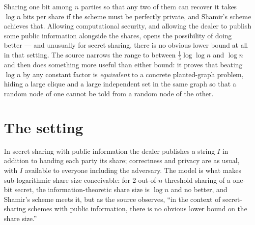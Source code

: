 \documentclass{aicr-conjecture}
\begin{document}

\vspace{0.4em}

\begin{informalconjecture}
Sharing one bit among $n$ parties so that any two of them can recover it
takes $\log n$ bits per share if the scheme must be perfectly private,
and Shamir's scheme achieves that. Allowing computational security, and
allowing the dealer to publish some public information alongside the
shares, opens the possibility of doing better --- and unusually for secret
sharing, there is no obvious lower bound at all in that setting. The
source narrows the range to between $\frac{1}{5}\log\log n$ and $\log n$
and then does something more useful than either bound: it proves that
beating $\log n$ by any constant factor is \emph{equivalent} to a concrete
planted-graph problem, hiding a large clique and a large independent set
in the same graph so that a random node of one cannot be told from a
random node of the other.
\end{informalconjecture}

\section{The setting}\label{sec:setting}

In secret sharing with public information the dealer publishes a string
$I$ in addition to handing each party its share; correctness and privacy
are as usual, with $I$ available to everyone including the adversary. The
model is what makes sub-logarithmic share size conceivable: for
$2$-out-of-$n$ threshold sharing of a one-bit secret, the
information-theoretic share size is $\log n$ and no better, and Shamir's
scheme meets it, but as the source observes, ``in the context of
secret-sharing schemes with public information, there is no obvious lower
bound on the share size.''
\end{document}
